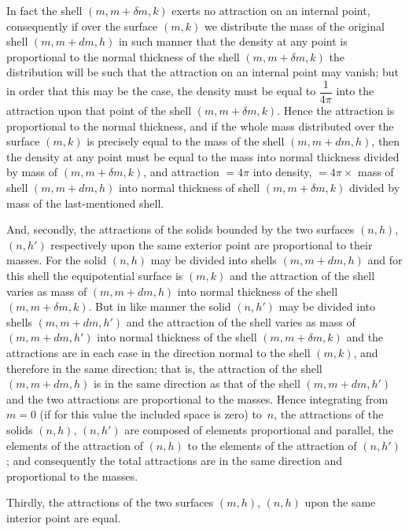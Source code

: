 \documentclass[12pt,a4paper]{article}
\theoremstyle{definition}
\begin{document}
In fact the shell $(m, m+\delta m, k)$ exerts no attraction on an internal point,
consequently if over the surface $(m, k)$ we distribute the mass of the original shell
$(m, m+dm, h)$ in such manner that the density at any point is proportional to the
normal thickness of the shell $(m, m+\delta m, k)$ the distribution will be such that the
attraction on an internal point may vanish; but in order that this may be the case,
the density must be equal to $\dfrac{1}{4\pi}$ into the attraction upon that point of the shell
$(m, m+\delta m, k)$. Hence the attraction is proportional to the normal thickness, and if
the whole mass distributed over the surface $(m, k)$ is precisely equal to the mass of
the shell $(m, m + dm, h)$, then the density at any point must be equal to the mass
into normal thickness divided by mass of $(m, m + \delta m, k)$, and attraction $= 4\pi$ into
density, $= 4\pi \times$ mass of shell $(m, m+dm, h)$ into normal thickness of shell $(m, m+\delta m, k)$
divided by mass of the last-mentioned shell.

And, secondly, the attractions of the solids bounded by the two surfaces $(n, h)$,
$(n, h')$ respectively upon the same exterior point are proportional to their masses.
For the solid $(n, h)$ may be divided into shells $(m, m+dm, h)$ and for this shell
the equipotential surface is $(m, k)$ and the attraction of the shell varies as mass of
$(m, m + dm, h)$ into normal thickness of the shell $(m, m+\delta m, k)$. But in like manner
the solid $(n, h')$ may be divided into shells $(m, m+dm, h')$ and the attraction of the
shell varies as mass of $(m, m + dm, h')$ into normal thickness of the shell $(m, m+\delta m, k)$
and the attractions are in each case in the direction normal to the shell $(m, k)$, and
therefore in the same direction; that is, the attraction of the shell $(m, m+dm, h)$
is in the same direction as that of the shell $(m, m + dm, h')$ and the two attractions
are proportional to the masses. Hence integrating from $m=0$ (if for this value the
included space is zero) to~$n$, the attractions of the solids $(n, h)$, $(n, h')$ are composed
of elements proportional and parallel, the elements of the attraction of $(n, h)$ to the
elements of the attraction of $(n, h')$; and consequently the total attractions are in the
same direction and proportional to the masses.

Thirdly, the attractions of the two surfaces $(m, h)$, $(n, h)$ upon the same interior
point are equal.

\smallskip
\end{document}
